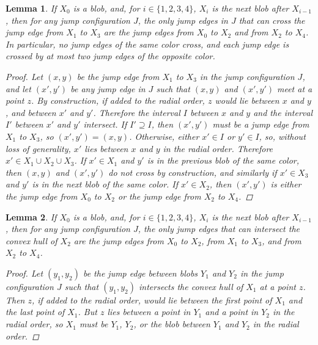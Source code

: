 \documentclass[12pt]{article}
\newtheorem{lemma}{Lemma}
\theoremstyle{definition}
\begin{document}
\begin{lemma}
  \label{lem:jump-config-crossing}
  If $X_0$ is a blob, and, for $i\in\{1,2,3,4\}$, $X_i$ is the next blob after $X_{i-1}$, then for any jump configuration $J$, the only jump edges in $J$ that can cross the jump edge from $X_1$ to $X_3$ are the jump edges from $X_0$ to $X_2$ and from $X_2$ to $X_4$.
  In particular, no jump edges of the same color cross, and each jump edge is crossed by at most two jump edges of the opposite color.

  \begin{proof}
    Let $(x,y)$ be the jump edge from $X_1$ to $X_3$ in the jump configuration $J$, and let $(x',y')$ be any jump edge in $J$ such that $(x,y)$ and $(x',y')$ meet at a point $z$.
    By construction, if added to the radial order, $z$ would lie between $x$ and $y$, and between $x'$ and $y'$.
    Therefore the interval $I$ between $x$ and $y$ and the interval $I'$ between $x'$ and $y'$ intersect.
    If $I'\supseteq I$, then $(x',y')$ must be a jump edge from $X_1$ to $X_3$, so $(x',y')=(x,y)$.
    Otherwise, either $x'\in I$ or $y'\in I$, so, without loss of generality, $x'$ lies between $x$ and $y$ in the radial order.
    Therefore $x'\in X_1 \cup X_2 \cup X_3$.
    If $x'\in X_1$ and $y'$ is in the previous blob of the same color, then $(x,y)$ and $(x',y')$ do not cross by construction, and similarly if $x'\in X_3$ and $y'$ is in the next blob of the same color.
    If $x'\in X_2$, then $(x',y')$ is either the jump edge from $X_0$ to $X_2$ or the jump edge from $X_2$ to $X_4$.
  \end{proof}
\end{lemma}

\begin{lemma}
  \label{lem:jump-config-cross-blob}
  If $X_0$ is a blob, and, for $i\in\{1,2,3,4\}$, $X_i$ is the next blob after $X_{i-1}$, then for any jump configuration $J$, the only jump edges that can intersect the convex hull of $X_2$ are the jump edges from $X_0$ to $X_2$, from $X_1$ to $X_3$, and from $X_2$ to $X_4$.

  \begin{proof}
    Let $(y_1,y_2)$ be the jump edge between blobs $Y_1$ and $Y_2$ in the jump configuration $J$ such that $(y_1,y_2)$ intersects the convex hull of $X_1$ at a point $z$.
    Then $z$, if added to the radial order, would lie between the first point of $X_1$ and the last point of $X_1$.
    But $z$ lies between a point in $Y_1$ and a point in $Y_2$ in the radial order, so $X_1$ must be $Y_1$, $Y_2$, or the blob between $Y_1$ and $Y_2$ in the radial order.
  \end{proof}
\end{lemma}
\end{document}
